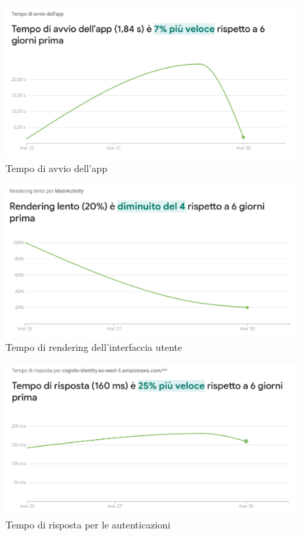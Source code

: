 \documentclass{natourDoc}
\begin{document}
\begin{figure}[!htbp]
	\centering
	\includegraphics[width=\textwidth]{./analytics/start-app.png}
	\caption{Tempo di avvio dell'app}
\end{figure}
\FloatBarrier

\begin{figure}[!htbp]
	\centering
	\includegraphics[width=\textwidth]{./analytics/rendering-performance.png}
	\caption{Tempo di rendering dell'interfaccia utente}
\end{figure}
\FloatBarrier

\begin{figure}[!htbp]
	\centering
	\includegraphics[width=\textwidth]{./analytics/identity-performance.png}
	\caption{Tempo di risposta per le autenticazioni}
\end{figure}
\FloatBarrier
\end{document}
